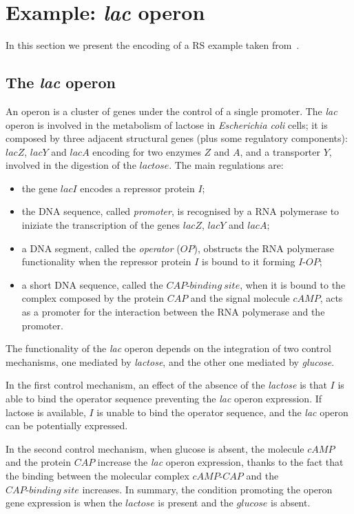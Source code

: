 \section{Example: \emph{lac} operon}
\label{ex:lactose}
In this section we present the encoding of a RS example
taken from~\cite{CMMBM12}.
\subsection{The \emph{lac} operon}
An operon is a cluster of genes under the control of a single promoter. 
The \emph{lac} operon  is involved in the metabolism of lactose in \emph{Escherichia coli} cells;
it is composed by three adjacent structural genes (plus some regulatory components):  $lacZ$, $lacY$ and $lacA$ encoding for two enzymes $Z$ and $A$, and a transporter $Y$, involved in the digestion of the $lactose$. The main regulations are:
\begin{itemize}
\item 
the gene $lacI$ encodes a repressor protein $I$;
\item the DNA sequence, called \emph{promoter},  is recognised by a RNA polymerase
to iniziate the transcription  of the genes $lacZ$, $lacY$ and $lacA$;
\item a DNA segment, called  the \emph{operator} ($OP$),   obstructs the RNA polymerase functionality when  the repressor protein $I$ is bound to it forming $I\textrm{-}OP$;
\item  a short DNA sequence, called the $CAP\textrm{-}binding\ site$, when it is bound to the complex composed by  the protein $CAP$ and the signal molecule $cAMP$, acts as a promoter for the interaction between the RNA polymerase and the promoter.
\end{itemize}
The functionality of the \emph{lac} operon depends on the integration of two control mechanisms, one mediated by \emph{lactose}, and the other one mediated by \emph{glucose}. 

In the first control mechanism, an effect of the absence of the \emph{lactose} is that $I$ is able to bind the operator sequence preventing the \emph{lac} operon expression. If lactose is available, $I$ is unable to bind the operator sequence, and the \emph{lac} operon can be potentially expressed.

In  the second control mechanism, when glucose is absent, the molecule $cAMP$ and the protein $CAP$ increase the \emph{lac} operon expression, thanks to the fact that  the binding between the molecular complex $cAMP\textrm{-}CAP$ and the $CAP\textrm{-}binding\ site$ increases.
In summary, the condition promoting the operon
gene expression is when the $lactose$ is present and the $glucose$ is absent.


